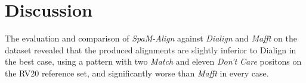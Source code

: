 \chapter{Discussion}

The evaluation and comparison of \textit{SpaM-Align} against \textit{Dialign} and \textit{Mafft} on the \bb dataset revealed that the produced alignments are slightly inferior to Dialign in the best case, using a pattern with two \textit{Match} and eleven \textit{Don't Care} positons on the RV20 reference set, and significantly worse than \textit{Mafft} in every case. 

%


